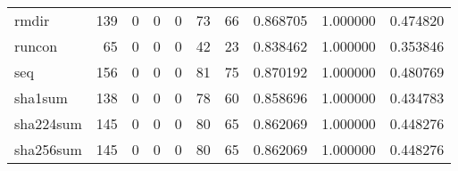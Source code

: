 \begin{tabular}{lrrrrrrrrr}
rmdir     &                                   139 &                                                  0 &                                                  0 &                                                  0 &                                                 73 &                                                 66 &                                           0.868705 &                               1.000000 &                             0.474820 \\
runcon    &                                    65 &                                                  0 &                                                  0 &                                                  0 &                                                 42 &                                                 23 &                                           0.838462 &                               1.000000 &                             0.353846 \\
seq       &                                   156 &                                                  0 &                                                  0 &                                                  0 &                                                 81 &                                                 75 &                                           0.870192 &                               1.000000 &                             0.480769 \\
sha1sum   &                                   138 &                                                  0 &                                                  0 &                                                  0 &                                                 78 &                                                 60 &                                           0.858696 &                               1.000000 &                             0.434783 \\
sha224sum &                                   145 &                                                  0 &                                                  0 &                                                  0 &                                                 80 &                                                 65 &                                           0.862069 &                               1.000000 &                             0.448276 \\
sha256sum &                                   145 &                                                  0 &                                                  0 &                                                  0 &                                                 80 &                                                 65 &                                           0.862069 &                               1.000000 &                             0.448276 \\

\end{tabular}
